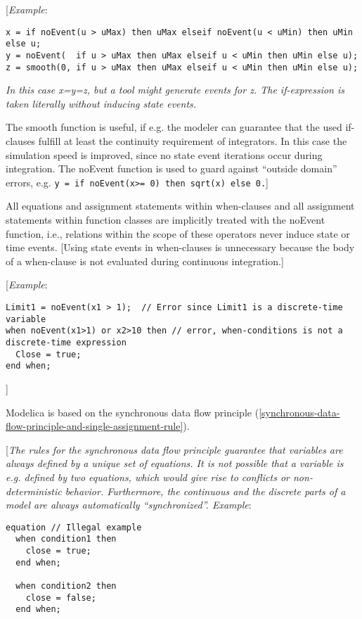 {[}\emph{Example}:
\begin{lstlisting}[language=modelica]
x = if noEvent(u > uMax) then uMax elseif noEvent(u < uMin) then uMin else u; 
y = noEvent(  if u > uMax then uMax elseif u < uMin then uMin else u); 
z = smooth(0, if u > uMax then uMax elseif u < uMin then uMin else u); 
\end{lstlisting}

\emph{In this case x=y=z, but a tool might generate events for z. The
if-expression is taken literally without inducing state events.}

The smooth function is useful, if e.g. the modeler can guarantee that
the used if-clauses fulfill at least the continuity requirement of
integrators. In this case the simulation speed is improved, since no
state event iterations occur during integration. The noEvent function is
used to guard against ``outside domain'' errors, e.g. \lstinline!y = if noEvent(x>= 0) then sqrt(x) else 0.!{]}

All equations and assignment statements within when-clauses and all
assignment statements within function classes are implicitly treated
with the noEvent function, i.e., relations within the scope of these
operators never induce state or time events. {[}Using state events in
when-clauses is unnecessary because the body of a when-clause is not
evaluated during continuous integration.{]}

{[}\emph{Example}:
\begin{lstlisting}[language=modelica]
Limit1 = noEvent(x1 > 1);  // Error since Limit1 is a discrete-time variable 
when noEvent(x1>1) or x2>10 then // error, when-conditions is not a discrete-time expression   
  Close = true; 
end when; 
\end{lstlisting}

{]}

Modelica is based on the synchronous data flow principle (\autoref{synchronous-data-flow-principle-and-single-assignment-rule}).

{[}\emph{The rules for the synchronous data flow principle guarantee
that variables are always defined by a unique set of equations. It is
not possible that a variable is e.g. defined by two equations, which
would give rise to conflicts or non-deterministic behavior. Furthermore,
the continuous and the discrete parts of a model are always
automatically ``synchronized''. Example}:

\begin{lstlisting}[language=modelica]
equation // Illegal example
  when condition1 then
    close = true;
  end when; 
 
  when condition2 then
    close = false;
  end when;
\end{lstlisting}

